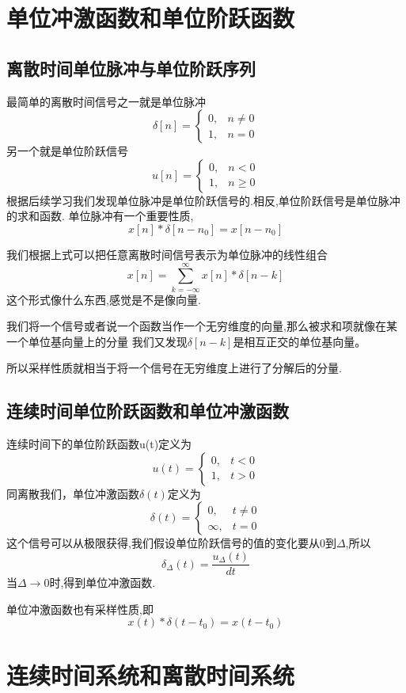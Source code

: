 \section{单位冲激函数和单位阶跃函数}
\subsection{离散时间单位脉冲与单位阶跃序列}
\qquad 最简单的离散时间信号之一就是单位脉冲
\[
\delta[n]=
\begin{cases}
    0,&n\neq 0\\
    1,&n=0
\end{cases}
\]
\qquad 另一个就是单位阶跃信号 
\[
u[n]=
\begin{cases}
    0,&n<  0\\
    1,&n \geq 0
\end{cases}
\]
根据后续学习我们发现单位脉冲是单位阶跃信号的.相反,单位阶跃信号是单位脉冲的求和函数.
单位脉冲有一个重要性质,
\[
x[n]*\delta[n-n_0]=x[n-n_0]
\]
\begin{note}
我们根据上式可以把任意离散时间信号表示为单位脉冲的线性组合
\[x[n]=\sum_{k=-\infty}^{\infty}x[n]*\delta[n-k]\]
\qquad 这个形式像什么东西,感觉是不是像向量.\par
\qquad 我们将一个信号或者说一个函数当作一个无穷维度的向量,那么被求和项就像在某一个单位基向量上的分量
我们又发现$\delta[n-k]$是相互正交的单位基向量。\par
\qquad 所以采样性质就相当于将一个信号在无穷维度上进行了分解后的分量.
\end{note}
\subsection{连续时间单位阶跃函数和单位冲激函数}
\qquad 连续时间下的单位阶跃函数u(t)定义为 
\[
u(t)=\begin{cases}
    0,&t<0\\
    1,&t> 0
\end{cases}
\]
\qquad 同离散我们，单位冲激函数$\delta(t)$定义为
\[
\delta(t)=\begin{cases}
    0,&t\neq 0\\
    \infty,&t=0
\end{cases}
\]
\qquad 这个信号可以从极限获得,我们假设单位阶跃信号的值的变化要从0到$\Delta$,所以
\[\delta_{\Delta}(t)=\frac{u_{\Delta}(t)}{dt}\]
\qquad 当$\Delta \to 0$时,得到单位冲激函数.\par 
\qquad 单位冲激函数也有采样性质,即\[
    x(t)*\delta(t-t_0)=x(t-t_0)
\]
\section{连续时间系统和离散时间系统}
